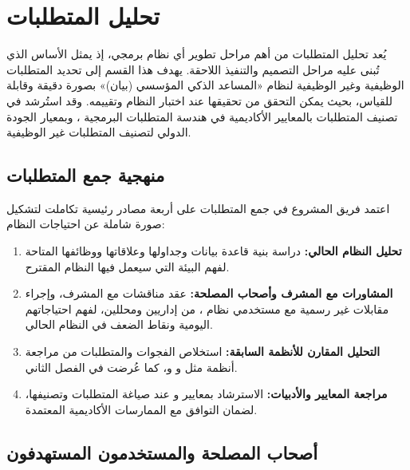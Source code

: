 \section{تحليل المتطلبات}
\label{sec:requirements}

يُعد تحليل المتطلبات من أهم مراحل تطوير أي نظام برمجي، إذ يمثل الأساس الذي تُبنى عليه مراحل التصميم والتنفيذ اللاحقة. يهدف هذا القسم إلى تحديد المتطلبات الوظيفية وغير الوظيفية لنظام «المساعد الذكي المؤسسي (بيان)» بصورة دقيقة وقابلة للقياس، بحيث يمكن التحقق من تحقيقها عند اختبار النظام وتقييمه. وقد استُرشد في تصنيف المتطلبات بالمعايير الأكاديمية في هندسة المتطلبات البرمجية \cite{ieee29148}، وبمعيار الجودة الدولي  \cite{iso25010} لتصنيف المتطلبات غير الوظيفية.

\subsection{منهجية جمع المتطلبات}
\label{subsec:requirements-elicitation}

اعتمد فريق المشروع في جمع المتطلبات على أربعة مصادر رئيسية تكاملت لتشكيل صورة شاملة عن احتياجات النظام:

\begin{enumerate}[label=\textbf{\arabic*.},leftmargin=*,itemsep=6pt]
  \item \textbf{تحليل النظام الحالي:} دراسة بنية قاعدة بيانات  وجداولها وعلاقاتها ووظائفها المتاحة لفهم البيئة التي سيعمل فيها النظام المقترح.
  \item \textbf{المشاورات مع المشرف وأصحاب المصلحة:} عقد مناقشات مع المشرف، وإجراء مقابلات غير رسمية مع مستخدمي نظام ، من إداريين ومحللين، لفهم احتياجاتهم اليومية ونقاط الضعف في النظام الحالي.
  \item \textbf{التحليل المقارن للأنظمة السابقة:} استخلاص الفجوات والمتطلبات من مراجعة أنظمة مثل  و و، كما عُرضت في الفصل الثاني.
  \item \textbf{مراجعة المعايير والأدبيات:} الاسترشاد بمعايير  \cite{ieee29148} و \cite{iso25010} عند صياغة المتطلبات وتصنيفها، لضمان التوافق مع الممارسات الأكاديمية المعتمدة.
\end{enumerate}

\subsection{أصحاب المصلحة والمستخدمون المستهدفون}
\label{subsec:stakeholders}

